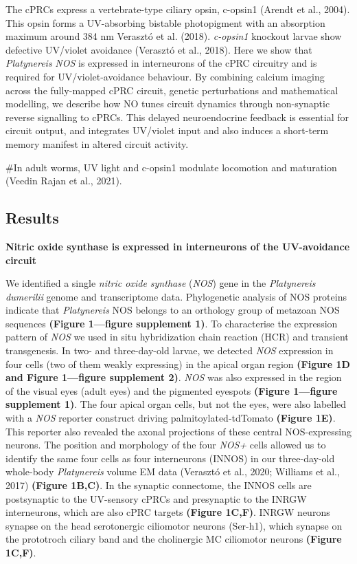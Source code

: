 \documentclass[
  10pt,
  onecolumn]{article}
\begin{document}
The cPRCs express a vertebrate-type ciliary opsin, c-opsin1 (Arendt et
al., 2004). This opsin forms a UV-absorbing bistable photopigment with
an absorption maximum around 384 nm Verasztó et al. (2018).
\emph{c-opsin1} knockout larvae show defective UV/violet avoidance
(Verasztó et al., 2018). Here we show that \emph{Platynereis} \emph{NOS}
is expressed in interneurons of the cPRC circuitry and is required for
UV/violet-avoidance behaviour. By combining calcium imaging across the
fully-mapped cPRC circuit, genetic perturbations and mathematical
modelling, we describe how NO tunes circuit dynamics through
non-synaptic reverse signalling to cPRCs. This delayed neuroendocrine
feedback is essential for circuit output, and integrates UV/violet input
and also induces a short-term memory manifest in altered circuit
activity.

\#In adult worms, UV light and c-opsin1 modulate locomotion and
maturation (Veedin Rajan et al., 2021).

\hypertarget{results}{%
\subsection{Results}\label{results}}

\textbf{Nitric oxide synthase is expressed in interneurons of the
UV-avoidance circuit}

We identified a single \emph{nitric oxide synthase} (\emph{NOS}) gene in
the \emph{Platynereis dumerilii} genome and transcriptome data.
Phylogenetic analysis of NOS proteins indicate that \emph{Platynereis}
NOS belongs to an orthology group of metazoan NOS sequences
\textbf{(Figure 1---figure supplement 1)}. To characterise the
expression pattern of \emph{NOS} we used in situ hybridization chain
reaction (HCR) and transient transgenesis. In two- and three-day-old
larvae, we detected \emph{NOS} expression in four cells (two of them
weakly expressing) in the apical organ region \textbf{(Figure 1D and
Figure 1---figure supplement 2)}. \emph{NOS} was also expressed in the
region of the visual eyes (adult eyes) and the pigmented eyespots
\textbf{(Figure 1---figure supplement 1)}. The four apical organ cells,
but not the eyes, were also labelled with a \emph{NOS} reporter
construct driving palmitoylated-tdTomato \textbf{(Figure 1E)}. This
reporter also revealed the axonal projections of these central
NOS-expressing neurons. The position and morphology of the four
\emph{NOS+} cells allowed us to identify the same four cells as four
interneurons (INNOS) in our three-day-old whole-body \emph{Platynereis}
volume EM data (Verasztó et al., 2020; Williams et al., 2017)
\textbf{(Figure 1B,C)}. In the synaptic connectome, the INNOS cells are
postsynaptic to the UV-sensory cPRCs and presynaptic to the INRGW
interneurons, which are also cPRC targets \textbf{(Figure 1C,F)}. INRGW
neurons synapse on the head serotonergic ciliomotor neurons (Ser-h1),
which synapse on the prototroch ciliary band and the cholinergic MC
ciliomotor neurons \textbf{(Figure 1C,F)}.
\end{document}
